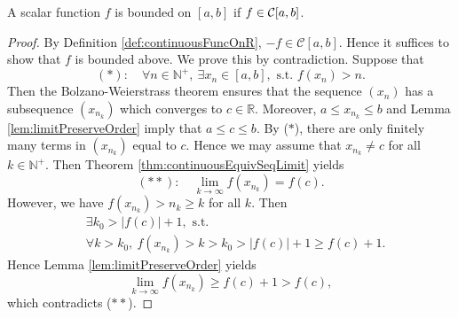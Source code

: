 \begin{thm}
  \label{thm:continuousImpliesBoundedness}
  A scalar function $f$ is bounded on $[a,b]$
   if $f\in {\cal C}[a,b]$.
\end{thm}
\begin{proof}
  By Definition \ref{def:continuousFuncOnR},
  $-f\in \mathcal{C}[a,b]$. Hence
  it suffices to show that $f$ is bounded above.
  We prove this by contradiction.
  Suppose that
  \begin{displaymath}
    (*):\quad
    \forall n\in \mathbb{N}^{+},\ \exists x_{n}\in [a,b],
    \text{ s.t. } f(x_{n})>n.
  \end{displaymath}
  Then the Bolzano-Weierstrass theorem
  ensures that the sequence $(x_{n})$ has a subsequence $(x_{n_{k}})$
  which converges to $c\in \mathbb{R}$. Moreover,
  $a\le x_{n_{k}}\le b$ and Lemma
  \ref{lem:limitPreserveOrder} imply that $a\le c\le b$.
  By ($\ast$), there are only finitely many terms in $(x_{n_{k}})$
  equal to $c$. Hence
  we may assume that $x_{n_{k}}\neq c$ for all $k\in \mathbb{N}^{+}$.
  Then Theorem \ref{thm:continuousEquivSeqLimit} yields
  \begin{displaymath}
    (**):\quad
    \lim_{k\rightarrow\infty}f(x_{n_{k}})=f(c).
  \end{displaymath}
  However, we have
  $f(x_{n_{k}})>n_{k}\ge k$ for all $k$.
  Then
  \begin{align*}
    &\exists k_{0}>|f(c)|+1,\text{ s.t. }\\
    &\forall k>k_{0},\ f(x_{n_{k}})>k>k_{0}>|f(c)|+1\ge f(c)+1.
  \end{align*}
  Hence Lemma \ref{lem:limitPreserveOrder} yields
  \begin{displaymath}
    \lim_{k\rightarrow\infty}f(x_{n_{k}})
  \ge f(c)+1>f(c),
  \end{displaymath}
  which contradicts ($\ast\ast$).
\end{proof}

